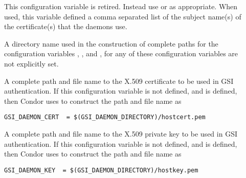 \begin{description}
\item[]
\label{param:SecAuthentication} \Todo

\item[]
\label{param:SecEncryption} \Todo

\item[]
\label{param:SecIntegrity} \Todo

\item[]
\label{param:SecNegotiation} \Todo

\item[]
\label{param:SecAuthenticationMethods} \Todo

\item[]
\label{param:SecCryptoMethods} \Todo

\item[]
\label{param:GSIDaemonName} This configuration variable is retired.
Instead use  or  as
appropriate. When used, this variable defined
a comma separated list of the subject
name(s) of the certificate(s) that the daemons use.

\item[]
\label{param:GSIDaemonDirectory} A directory name used in the
construction of complete paths for the configuration variables
,
, and
,
for any of these configuration variables are not explicitly set.

\item[]
\label{param:GSIDaemonCert} A complete path and file name to the
X.509 certificate to be used in GSI authentication.
If this configuration variable is not defined, and
 is defined, then Condor uses
 to construct the path and file name as
\begin{verbatim}
GSI_DAEMON_CERT  = $(GSI_DAEMON_DIRECTORY)/hostcert.pem
\end{verbatim}

\item[]
\label{param:GSIDaemonKey}  A complete path and file name to the
X.509 private key to be used in GSI authentication.
If this configuration variable is not defined, and
 is defined, then Condor uses
 to construct the path and file name as
\begin{verbatim}
GSI_DAEMON_KEY  = $(GSI_DAEMON_DIRECTORY)/hostkey.pem
\end{verbatim}


\end{description}
